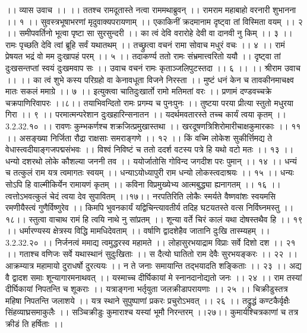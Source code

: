 ।। व्यास उवाच ।। ।।
ततश्च रामदूतास्ते नत्वा राममथाब्रुवन् ।।
रामराम महाबाहो वरनारी शुभानना ।। १ ।।
सुवस्त्रभूषाभरणां मृदुवाक्यपरायणाम् ।।
एकाकिनीं क्रदमानाम दृष्ट्वा तां विस्मिता वयम् ।। २ ।।
समीपवर्तिनो भूत्वा पृष्टा सा सुरसुन्दरी ।।
का त्वं देवि वरारोहे देवी वा दानवी नु किम् ।। ३ ।।
रामः पृच्छति देवि त्वां ब्रूहि सर्वं यथातथम् ।।
तच्छ्रुत्वा वचनं रामा सोवाच मधुरं वचः ।। ४ ।।
रामं प्रेषयत भद्रं वो मम दुःखापहं परम् ।। ५ ।।
तदाकर्ण्य ततो रामः संभ्रमात्त्वरितो ययौ ।।
दृष्ट्वा तां दुःखसन्तप्तां स्वयं दुःखमवाप सः ।।
उवाच वचनं रामः कृताञ्जलिपुटस्तदा ।। ६ ।।
।। श्रीराम उवाच ।। ।।
का त्वं शुभे कस्य परिग्रहो वा केनावधूता विजने निरस्ता ।।
मुष्टं धनं केन च तावकीनमाचक्ष्व मातः सकलं ममाग्रे ।। ७ ।।
इत्युक्त्वा चातिदुःखार्तो रामो मतिमतां वरः ।।
प्रणामं दण्डवच्चक्रे चक्रपाणिरिवापरः ।।८।।
तयाभिवन्दितो रामः प्रगम्य च पुनःपुनः ।।
तुष्टया परया प्रीत्या स्तुतो मधुरया गिरा ।। ९ ।।
परमात्मन्परेशान दुःखहारिन्सनातन ।।
यदर्थमवतारस्ते तच्च कार्यं त्वया कृतम् ।। 3.2.32.१० ।।
रावणः कुम्भकर्णश्च शक्रजित्प्रमुखास्तथा ।।
खरदूषणत्रिशिरोमारीचाक्षकुमारकाः ।। ११ ।।
असङ्ख्या निर्जिता रौद्रा राक्षसाः समराङ्गणे ।। १२ ।।
किं वच्मि लोकेश सुकीर्त्तिमद्य ते वेधास्त्वदीयाङ्गजपद्मसंभवः ।।
विश्वं निविष्टं च ततो ददर्श वटस्य पत्रे हि यथो वटो मतः ।। १३ ।।
धन्यो दशरथो लोके कौशल्या जननी तव ।।
ययोर्जातोसि गोविन्द जगदीश परः पुमान् ।। १४ ।।
धन्यं च तत्कुलं राम यत्र त्वमागतः स्वयम् ।।
धन्याऽयोध्यापुरी राम धन्यो लोकस्त्वदाश्रयः ।। १५ ।।
धन्यः सोऽपि हि वाल्मीकिर्येन रामायणं कृतम् ।।
कविना विप्रमुख्येभ्य आत्मबुद्ध्या ह्यनागतम् ।। १६ ।।
त्वत्तोऽभवत्कुलं चेदं त्वया देव सुपावितम् ।।१७।।
नरपतिरिति लोकैः स्मर्यते वैष्णवांशः स्वयमसि रमणीयैस्त्वं गुणैर्विष्णुरेव ।।
किमपि भुवनकार्यं यद्विचिन्त्यावतीर्य तदिह घटयतस्ते वत्स निर्विघ्नमस्तु ।।१८।।
स्तुत्वा वाचाथ रामं हि त्वयि नाथे नु सांप्रतम् ।।
शून्या वर्ते चिरं कालं यथा दोषस्तथैव हि ।। १९ ।।
धर्मारण्यस्य क्षेत्रस्य विद्धि मामधिदेवताम् ।।
वर्षाणि द्वादशेहैव जातानि दुःखि तास्म्यहम् ।। 3.2.32.२० ।।
निर्जनत्वं ममाद्य त्वमुद्धरस्व महामते ।।
लोहासुरभयाद्राम विप्राः सर्वे दिशो दश ।। २१ ।।
गताश्च वणिजः सर्वे यथास्थानं सुदुःखिताः ।।
स दैत्यो घातितो राम देवैः सुरभयङ्करः ।। २२ ।।
आक्रम्यात्र महामायो दुराधर्षो दुरत्ययः ।।
न ते जनाः समायान्ति तद्भयादति शङ्किताः ।। २३ ।।
अद्य वै द्वादश समाः शून्यागारमनाथवत् ।।
यस्माच्च दीर्घिकायां मे स्नानदानोद्यतो जनः ।। २४ ।।
राम तस्यां दीर्घिकायां निपतन्ति च शूकराः ।।
यत्राङ्गना भर्तृयुता जलक्रीडापरायणाः ।। २५ ।।
चिक्रीडुस्तत्र महिषा निपतन्ति जलाशये ।।
यत्र स्थाने सुपुष्पाणां प्रकरः प्रचुरोऽभवत् ।। २६ ।।
तद्रुद्धं कण्टकैर्वृक्षैः सिंहव्याघ्रसमाकुलैः ।।
सञ्चिक्रीडुः कुमाराश्च यस्यां भूमौ निरन्तरम् ।।२७।।
कुमार्यश्चित्रकाणां च तत्र क्रीडं ति हर्षिताः ।।
